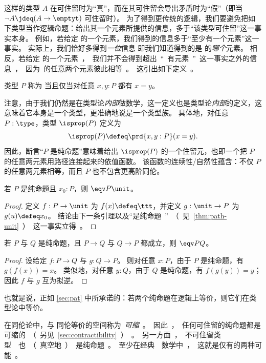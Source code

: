 这样的类型 $A$ 在可住留时为“真”，而在其可住留会导出矛盾时为“假”（即当 $\neg A \jdeq (A\to\emptyt)$ 可住留时）。
%
为了得到更传统的逻辑，我们要避免把如下类型当作逻辑命题：给出其一个元素所提供的信息，多于“该类型可住留”这一事实本身。
例如，若给定 \bool 的一个元素，我们得到的信息多于“\bool 至少有一个元素”这一事实。
实际上，我们恰好多得到\emph{一位}信息
%
即我们知道得到的是 \bool 的\emph{哪个}元素。
相反，若给定 \unit 的一个元素，我们并不会得到超出“\unit 有元素”这一事实之外的信息，因为 \unit 的任意两个元素彼此相等。
这引出如下定义。

\begin{defn}\label{defn:isprop}
  类型 $P$ 称为 
  当且仅当对任意 $x,y:P$ 都有 $x=y$。
\end{defn}

注意，由于我们仍然是在类型论\emph{内部}做数学，这一定义也是类型论\emph{内部}的定义，这意味着它本身是一个类型，更准确地说是一个类型族。
具体地，对任意 $P:\type$，类型 $\isprop(P)$ 定义为
\[ \isprop(P) \defeq \prd{x,y:P} (x=y). \]
因此，断言“$P$ 是纯命题”意味着给出 $\isprop(P)$ 的一个住留元，也即一个把 $P$ 的任意两元素用路径连接起来的依值函数。
该函数的连续性/自然性蕴含：不仅 $P$ 的任意两元素相等，而且 $P$ 也不包含更高阶同伦。

\begin{lem}\label{thm:inhabprop-eqvunit}
  若 $P$ 是纯命题且 $x_0:P$，则 $\eqv P \unit$。
\end{lem}
\begin{proof}
  定义 $f:P\to\unit$ 为 $f(x)\defeq \ttt$，并定义 $g:\unit\to P$ 为 $g(u)\defeq x_0$。
  结论由下一条引理以及“\unit 是纯命题”（见 \cref{thm:path-unit}）这一事实立得。
\end{proof}

\begin{lem}\label{lem:equiv-iff-hprop}
  若 $P$ 与 $Q$ 是纯命题，且 $P\to Q$ 与 $Q\to P$ 都成立，则 $\eqv P Q$。
\end{lem}
\begin{proof}
  设给定 $f:P\to Q$ 与 $g:Q\to P$。
  则对任意 $x:P$，由于 $P$ 是纯命题，有 $g(f(x))=x$。
  类似地，对任意 $y:Q$，由于 $Q$ 是纯命题，有 $f(g(y))=y$；因此 $f$ 与 $g$ 互为拟逆。
\end{proof}

也就是说，正如 \cref{sec:pat} 中所承诺的：若两个纯命题在逻辑上等价，则它们在类型论中等价。

在同伦论中，与 \unit 同伦等价的空间称为\emph{可缩}。
因此，任何可住留的纯命题都是可缩的（另见 \cref{sec:contractibility}）。
另一方面，不可住留类型 \emptyt 也（真空地）是纯命题。
至少在经典数学中，这就是仅有的两种可能。

